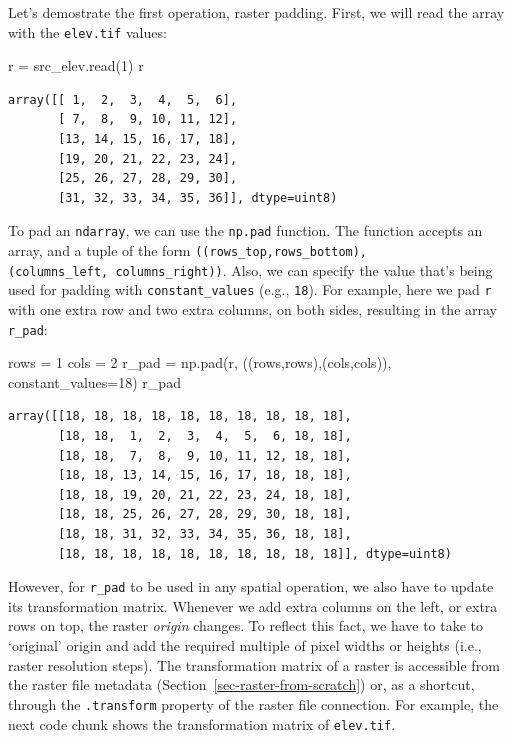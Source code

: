 \documentclass[
  letterpaper,
]{krantz}
\newenvironment{Shaded}{\begin{snugshade}}{\end{snugshade}}
\newcommand{\DecValTok}[1]{\textcolor[rgb]{0.68,0.00,0.00}{#1}}
\newcommand{\NormalTok}[1]{\textcolor[rgb]{0.00,0.23,0.31}{#1}}
\newcommand{\OperatorTok}[1]{\textcolor[rgb]{0.37,0.37,0.37}{#1}}
\begin{document}
Let's demostrate the first operation, raster padding. First, we will
read the array with the \texttt{elev.tif} values:

\begin{Shaded}
\begin{Highlighting}[]
\NormalTok{r }\OperatorTok{=}\NormalTok{ src\_elev.read(}\DecValTok{1}\NormalTok{)}
\NormalTok{r}
\end{Highlighting}
\end{Shaded}

\begin{verbatim}
array([[ 1,  2,  3,  4,  5,  6],
       [ 7,  8,  9, 10, 11, 12],
       [13, 14, 15, 16, 17, 18],
       [19, 20, 21, 22, 23, 24],
       [25, 26, 27, 28, 29, 30],
       [31, 32, 33, 34, 35, 36]], dtype=uint8)
\end{verbatim}

To pad an \texttt{ndarray}, we can use the \texttt{np.pad} function. The
function accepts an array, and a tuple of the form
\texttt{((rows\_top,rows\_bottom),(columns\_left,\ columns\_right))}.
Also, we can specify the value that's being used for padding with
\texttt{constant\_values} (e.g., \texttt{18}). For example, here we pad
\texttt{r} with one extra row and two extra columns, on both sides,
resulting in the array \texttt{r\_pad}:

\begin{Shaded}
\begin{Highlighting}[]
\NormalTok{rows }\OperatorTok{=} \DecValTok{1}
\NormalTok{cols }\OperatorTok{=} \DecValTok{2}
\NormalTok{r\_pad }\OperatorTok{=}\NormalTok{ np.pad(r, ((rows,rows),(cols,cols)), constant\_values}\OperatorTok{=}\DecValTok{18}\NormalTok{)}
\NormalTok{r\_pad}
\end{Highlighting}
\end{Shaded}

\begin{verbatim}
array([[18, 18, 18, 18, 18, 18, 18, 18, 18, 18],
       [18, 18,  1,  2,  3,  4,  5,  6, 18, 18],
       [18, 18,  7,  8,  9, 10, 11, 12, 18, 18],
       [18, 18, 13, 14, 15, 16, 17, 18, 18, 18],
       [18, 18, 19, 20, 21, 22, 23, 24, 18, 18],
       [18, 18, 25, 26, 27, 28, 29, 30, 18, 18],
       [18, 18, 31, 32, 33, 34, 35, 36, 18, 18],
       [18, 18, 18, 18, 18, 18, 18, 18, 18, 18]], dtype=uint8)
\end{verbatim}

However, for \texttt{r\_pad} to be used in any spatial operation, we
also have to update its transformation matrix. Whenever we add extra
columns on the left, or extra rows on top, the raster \emph{origin}
changes. To reflect this fact, we have to take to `original' origin and
add the required multiple of pixel widths or heights (i.e., raster
resolution steps). The transformation matrix of a raster is accessible
from the raster file metadata (Section~\ref{sec-raster-from-scratch})
or, as a shortcut, through the \texttt{.transform} property of the
raster file connection. For example, the next code chunk shows the
transformation matrix of \texttt{elev.tif}.
\end{document}
